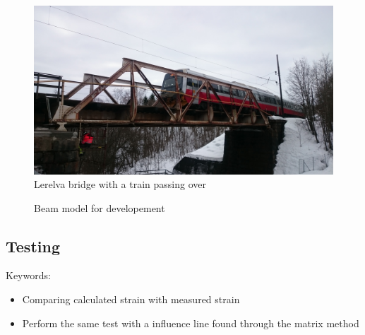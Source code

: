 \begin{figure}[H]
	\includegraphics[width=\textwidth]{figures/train_passing.jpg}
	\caption{Lerelva bridge with a train passing over}
	\label{fig:lerelva_bridge}
\end{figure}

\begin{figure}[htpb]
	\caption{Beam model for developement}
	\label{figure:systemSketch}
\end{figure}

\subsection{Testing}
Keywords:
\begin{itemize}
\item Comparing calculated strain with measured strain
\item Perform the same test with a influence line found through the matrix method
\end{itemize}

